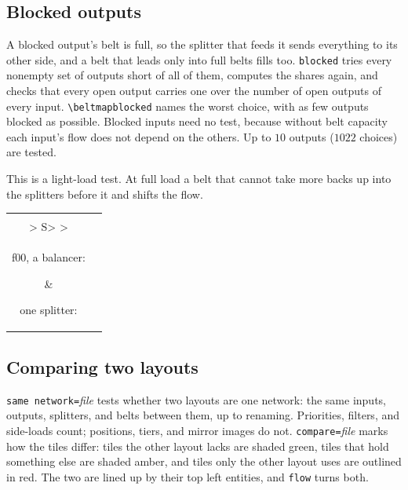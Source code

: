 \documentclass[11pt]{article}
\newcommand\cs[1]{\texttt{\textbackslash#1}}
\newcommand\key[1]{\texttt{#1}}
\newenvironment{pictures}[1]{\tagpdfsetup{table/tagging=presentation}\begin{tabular}{#1}}{\end{tabular}}
\begin{document}
	\subsection{Blocked outputs}
	\label{sec:blocked}

	A blocked output's belt is full, so the splitter that feeds it sends everything to its other side, and a belt that leads only into full belts fills too. \key{blocked} tries every nonempty set of outputs short of all of them, computes the shares again, and checks that every open output carries one over the number of open outputs of every input. \cs{beltmapblocked} names the worst choice, with as few outputs blocked as possible. Blocked inputs need no test, because without belt capacity each input's flow does not depend on the others. Up to $10$ outputs ($1022$ choices) are tested.

	This is a light-load test. At full load a belt that cannot take more backs up into the splitters before it and shifts the flow.

	\begin{center}
		\begin{pictures}{@{}c@{\qquad}c@{}}
			\beltlayout[mix=bands, blocked, labels, tile=3.4mm, expect={balanced, blocked-unbalanced}]{examples/f00_9x10.json}\global\let\beltmapblockedA\beltmapblocked &
			\begin{beltgrid}[mix=bands, blocked, labels, tile=6mm, expect=blocked]
				> S> > \\
				> S> >
			\end{beltgrid} \\[4pt]
			\parbox[t]{0.46\linewidth}{\centering\small f00, a balancer: \beltmapblockedA} &
			\parbox[t]{0.36\linewidth}{\centering\small one splitter: \beltmapblocked}
		\end{pictures}
	\end{center}

	\subsection{Comparing two layouts}
	\label{sec:same}

	\key{same network=}\emph{file} tests whether two layouts are one network: the same inputs, outputs, splitters, and belts between them, up to renaming. Priorities, filters, and side-loads count; positions, tiers, and mirror images do not. \key{compare=}\emph{file} marks how the tiles differ: tiles the other layout lacks are shaded green, tiles that hold something else are shaded amber, and tiles only the other layout uses are outlined in red. The two are lined up by their top left entities, and \key{flow} turns both.
\end{document}
